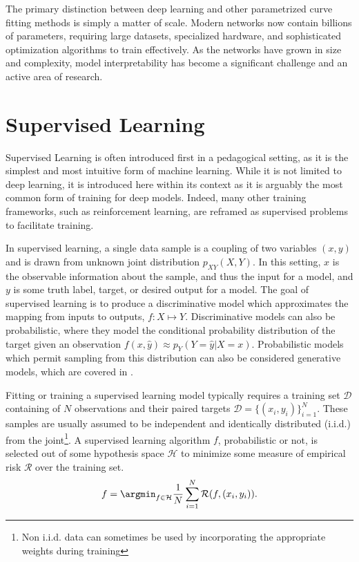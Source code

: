 The primary distinction between deep learning and other parametrized curve fitting methods is simply a matter of scale.
Modern networks now contain billions of parameters, requiring large datasets, specialized hardware, and sophisticated optimization algorithms to train effectively.
As the networks have grown in size and complexity, model interpretability has become a significant challenge and an active area of research.

\section{Supervised Learning}

Supervised Learning is often introduced first in a pedagogical setting, as it is the simplest and most intuitive form of machine learning. While it is not limited to deep learning, it is introduced here within its context as it is arguably the most common form of training for deep models. Indeed, many other training frameworks, such as reinforcement learning, are reframed as supervised problems to facilitate training.

In supervised learning, a single data sample is a coupling of two variables $(x, y)$ and is drawn from unknown joint distribution $p_{XY}(X, Y)$.
In this setting, $x$ is the observable information about the sample, and thus the input for a model, and $y$ is some truth label, target, or desired output for a model.
The goal of supervised learning is to produce a discriminative model which approximates the mapping from inputs to outputs, $f: X \mapsto Y$.
Discriminative models can also be probabilistic, where they model the conditional probability distribution of the target given an observation $f(x, \hat y) \approx p_Y(Y=\hat y|X=x)$.
Probabilistic models which permit sampling from this distribution can also be considered generative models, which are covered in .

Fitting or training a supervised learning model typically requires a training set $\mathcal{D}$ containing of $N$ observations and their paired targets $\mathcal{D} = \{(x_i, y_i)\}_{i=1}^N$.
These samples are usually assumed to be independent and identically distributed (i.i.d.) from the joint\footnote{Non i.i.d. data can sometimes be used by incorporating the appropriate weights during training}.
A supervised learning algorithm $f$, probabilistic or not, is selected out of some hypothesis space $\mathcal{H}$ to minimize some measure of empirical risk $\mathcal{R}$ over the training set.
\begin{equation}
    f = \argmin_{f \in \mathcal{H}} \frac{1}{N} \sum_{i=1}^N \mathcal{R}(f, (x_i, y_i)).
\end{equation}

